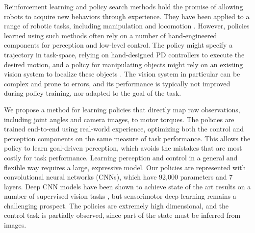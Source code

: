 \documentclass[conference]{IEEEtran}
\begin{document}
Reinforcement learning and policy search methods hold the promise of allowing robots to acquire new behaviors through experience. They have been applied to a range of robotic tasks, including manipulation \cite{drf-lclcm-11,kop-rlarm-10} and locomotion \cite{emmnc-lcbbl-08,gpw-fbwrc-06,kp-pgrlf-04,tzs-spgrl-04}. However, policies learned using such methods often rely on a number of hand-engineered components for perception and low-level control. The policy might specify a trajectory in task-space, relying on hand-designed PD controllers to execute the desired motion, and a policy for manipulating objects might rely on an existing vision system to localize these objects \cite{phas-lgmsl-09}. The vision system in particular can be complex and prone to errors, and its performance is typically not improved during policy training, nor adapted to the goal of the task.

We propose a method for learning policies that directly map raw observations, including joint angles and camera images, to motor torques. The policies are trained end-to-end using real-world experience, optimizing both the control and perception components on the same measure of task performance. This allows the policy to learn goal-driven perception, which avoids the mistakes that are most costly for task performance. Learning perception and control in a general and flexible way requires a large, expressive model. Our policies are represented with convolutional neural networks (CNNs), which have 92,000 parameters and 7 layers. Deep CNN models have been shown to achieve state of the art results on a number of supervised vision tasks \cite{gddm-fhaod-13,ksh-incdc-12,tjlb-jcngm-14}, but sensorimotor deep learning remains a challenging prospect. The policies are extremely high dimensional, and the control task is partially observed, since part of the state must be inferred from images.
\end{document}
